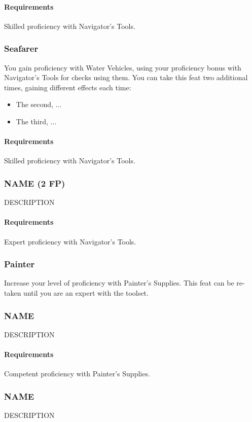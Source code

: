     \paragraph{Requirements} Skilled proficiency with Navigator's Tools.
\subsubsection{Seafarer} \label{feat::seafarer}
    You gain proficiency with Water Vehicles, using your proficiency bonus with Navigator's Tools for checks using them.
    You can take this feat two additional times, gaining different effects each time:
    \begin{itemize}
        \item The second, ...
        \item The third, ... %
    \end{itemize}
    \paragraph{Requirements} Skilled proficiency with Navigator's Tools.
\subsubsection{NAME (2 FP)} \label{feat::name}
    DESCRIPTION
    \paragraph{Requirements} Expert proficiency with Navigator's Tools.
\subsubsection{Painter} \label{feat::painter}
    Increase your level of proficiency with Painter's Supplies.
    This feat can be re-taken until you are an expert with the toolset.
\subsubsection{NAME} \label{feat::name}
    DESCRIPTION
    \paragraph{Requirements} Competent proficiency with Painter's Supplies.
\subsubsection{NAME} \label{feat::name}
    DESCRIPTION
